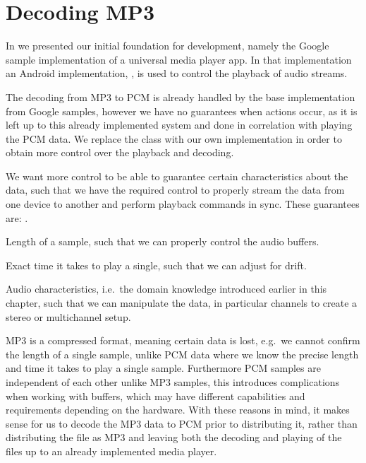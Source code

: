 \section{Decoding MP3}
In  we presented our initial foundation for development, namely the Google sample implementation of a universal media player app.
In that implementation an Android implementation, , is used to control the playback of audio streams.

The decoding from MP3 to \ac{PCM} is already handled by the base implementation from Google samples, however we have no guarantees when actions occur, as it is left up to this already implemented system and done in correlation with playing the \ac{PCM} data.
We replace the  class with our own implementation in order to obtain more control over the playback and decoding.

We want more control to be able to guarantee certain characteristics about the data, such that we have the required control to properly stream the data from one device to another and perform playback commands in sync.
These guarantees are: .
\begin{eletterate*}
    \item Length of a sample, such that we can properly control the audio buffers.
    \item Exact time it takes to play a single, such that we can adjust for drift.
    \item Audio characteristics, i.e.\ the domain knowledge introduced earlier in this chapter, such that we can manipulate the data, in particular channels to create a stereo or multichannel setup.
\end{eletterate*}

MP3 is a compressed format, meaning certain data is lost, e.g.\ we cannot confirm the length of a single sample, unlike \ac{PCM} data where we know the precise length and time it takes to play a single sample.
Furthermore \ac{PCM} samples are independent of each other unlike MP3 samples, this introduces complications when working with buffers, which may have different capabilities and requirements depending on the hardware.
With these reasons in mind, it makes sense for us to decode the MP3 data to \ac{PCM} prior to distributing it, rather than distributing the file as MP3 and leaving both the decoding and playing of the files up to an already implemented media player.

